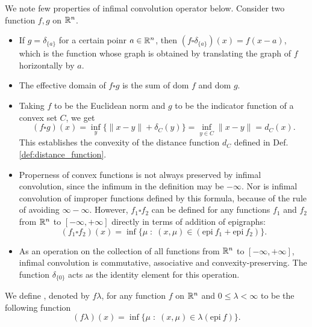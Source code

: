 \documentclass[11pt,a4paper]{article}
\begin{document}
\begin{remark}
    We note few properties of infimal convolution operator below. Consider two function $f,g$ on $\mathbb{R}^n$.
    \begin{itemize}
        \item If $g = \delta_{\{a\}}$ for a certain poinr $a\in \mathbb{R}^n$, then $(f\square \delta_{\{a\}})(x) = f(x-a)$, which is the function whose graph is obtained by translating the graph of $f$ horizontally by $a$.
        \item The effective domain of $f\square g$ is the sum of dom $f$ and dom $g$.
        \item Taking $f$ to be the Euclidean norm and $g$ to be the indicator function of a convex set $C$, we get
        \begin{equation*}
            (f\square g)(x) = \inf_y \{\|x-y\|+\delta_C(y)\} = \inf_{y\in C} \|x-y\| = d_C(x).
        \end{equation*}
        This establishes the convexity of the distance function $d_C$ defined in Def. \ref{def:distance_function}.
        \item Properness of convex functions is not always preserved by infimal convolution, since the infimum in the definition may be $-\infty$. Nor is infimal convolution of improper functions defined by this formula, because of the rule of avoiding $\infty-\infty$. However, $f_1\square f_2$ can be defined for any functions $f_1$ and $f_2$ from $\mathbb{R}^n$ to $[-\infty,+\infty]$ directly in terms of addition of epigraphs:
        \begin{equation*}
            (f_1\square f_2)(x) = \inf\{\mu\;:\; (x,\mu)\in (\mathrm{epi}\ f_1+\mathrm{epi}\ f_2)\}.
        \end{equation*}
        \item As an operation on the collection of all functions from $\mathbb{R}^n$ to $[-\infty,+\infty]$, infimal convolution is commutative, associative and convexity-preserving. The function $\delta_{\{0\}}$ acts as the identity element for this operation. 
    \end{itemize}
\end{remark}

\begin{definition}
    We define , denoted by $f\lambda$,  for any function $f$ on $\mathbb{R}^n$ and $0\le\lambda<\infty$ to be the following function
    \begin{equation*}
        (f\lambda)(x) = \inf\{\mu\;:\;(x,\mu)\in \lambda (\mathrm{epi}\ f)\}.
    \end{equation*}
\end{definition}
\end{document}
